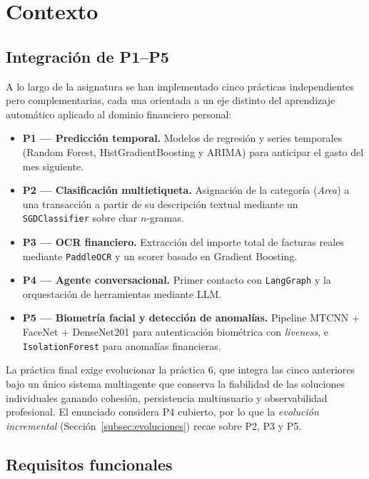 \section{Contexto}
\label{sec:contexto}

\subsection{Integración de P1--P5}

A lo largo de la asignatura se han implementado cinco prácticas
independientes pero complementarias, cada una orientada a un eje
distinto del aprendizaje automático aplicado al dominio financiero
personal:

\begin{itemize}[leftmargin=1.5em,itemsep=0.2em]
  \item \textbf{P1 --- Predicción temporal.} Modelos de regresión y
        series temporales (Random Forest, HistGradientBoosting y
        ARIMA) para anticipar el gasto del mes siguiente.
  \item \textbf{P2 --- Clasificación multietiqueta.} Asignación de la
        categoría (\textit{Area}) a una transacción a partir de su
        descripción textual mediante un \texttt{SGDClassifier} sobre
        char $n$-gramas.
  \item \textbf{P3 --- OCR financiero.} Extracción del importe total
        de facturas reales mediante \texttt{PaddleOCR} y un scorer
        basado en Gradient Boosting.
  \item \textbf{P4 --- Agente conversacional.} Primer contacto con
        \texttt{LangGraph} y la orquestación de herramientas mediante
        LLM.
  \item \textbf{P5 --- Biometría facial y detección de anomalías.}
        Pipeline MTCNN + FaceNet + DenseNet201 para autenticación
        biométrica con \textit{liveness}, e \texttt{IsolationForest}
        para anomalías financieras.
\end{itemize}

La práctica final exige evolucionar la práctica 6, que integra las cinco anteriores bajo un único sistema
multiagente que conserva la fiabilidad de las soluciones individuales
ganando cohesión, persistencia multiusuario y observabilidad
profesional. El enunciado considera P4 cubierto, por lo
que la \textit{evolución incremental} (Sección~\ref{subsec:evoluciones})
recae sobre P2, P3 y P5.

\subsection{Requisitos funcionales}

